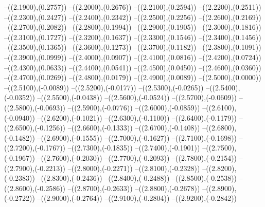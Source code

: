{	--({\sx*(2.1900)},{\sy*(0.2757)})
	--({\sx*(2.2000)},{\sy*(0.2676)})
	--({\sx*(2.2100)},{\sy*(0.2594)})
	--({\sx*(2.2200)},{\sy*(0.2511)})
	--({\sx*(2.2300)},{\sy*(0.2427)})
	--({\sx*(2.2400)},{\sy*(0.2342)})
	--({\sx*(2.2500)},{\sy*(0.2256)})
	--({\sx*(2.2600)},{\sy*(0.2169)})
	--({\sx*(2.2700)},{\sy*(0.2082)})
	--({\sx*(2.2800)},{\sy*(0.1994)})
	--({\sx*(2.2900)},{\sy*(0.1905)})
	--({\sx*(2.3000)},{\sy*(0.1816)})
	--({\sx*(2.3100)},{\sy*(0.1727)})
	--({\sx*(2.3200)},{\sy*(0.1637)})
	--({\sx*(2.3300)},{\sy*(0.1546)})
	--({\sx*(2.3400)},{\sy*(0.1456)})
	--({\sx*(2.3500)},{\sy*(0.1365)})
	--({\sx*(2.3600)},{\sy*(0.1273)})
	--({\sx*(2.3700)},{\sy*(0.1182)})
	--({\sx*(2.3800)},{\sy*(0.1091)})
	--({\sx*(2.3900)},{\sy*(0.0999)})
	--({\sx*(2.4000)},{\sy*(0.0907)})
	--({\sx*(2.4100)},{\sy*(0.0816)})
	--({\sx*(2.4200)},{\sy*(0.0724)})
	--({\sx*(2.4300)},{\sy*(0.0633)})
	--({\sx*(2.4400)},{\sy*(0.0541)})
	--({\sx*(2.4500)},{\sy*(0.0450)})
	--({\sx*(2.4600)},{\sy*(0.0360)})
	--({\sx*(2.4700)},{\sy*(0.0269)})
	--({\sx*(2.4800)},{\sy*(0.0179)})
	--({\sx*(2.4900)},{\sy*(0.0089)})
	--({\sx*(2.5000)},{\sy*(0.0000)})
	--({\sx*(2.5100)},{\sy*(-0.0089)})
	--({\sx*(2.5200)},{\sy*(-0.0177)})
	--({\sx*(2.5300)},{\sy*(-0.0265)})
	--({\sx*(2.5400)},{\sy*(-0.0352)})
	--({\sx*(2.5500)},{\sy*(-0.0438)})
	--({\sx*(2.5600)},{\sy*(-0.0524)})
	--({\sx*(2.5700)},{\sy*(-0.0609)})
	--({\sx*(2.5800)},{\sy*(-0.0693)})
	--({\sx*(2.5900)},{\sy*(-0.0776)})
	--({\sx*(2.6000)},{\sy*(-0.0859)})
	--({\sx*(2.6100)},{\sy*(-0.0940)})
	--({\sx*(2.6200)},{\sy*(-0.1021)})
	--({\sx*(2.6300)},{\sy*(-0.1100)})
	--({\sx*(2.6400)},{\sy*(-0.1179)})
	--({\sx*(2.6500)},{\sy*(-0.1256)})
	--({\sx*(2.6600)},{\sy*(-0.1333)})
	--({\sx*(2.6700)},{\sy*(-0.1408)})
	--({\sx*(2.6800)},{\sy*(-0.1482)})
	--({\sx*(2.6900)},{\sy*(-0.1555)})
	--({\sx*(2.7000)},{\sy*(-0.1627)})
	--({\sx*(2.7100)},{\sy*(-0.1698)})
	--({\sx*(2.7200)},{\sy*(-0.1767)})
	--({\sx*(2.7300)},{\sy*(-0.1835)})
	--({\sx*(2.7400)},{\sy*(-0.1901)})
	--({\sx*(2.7500)},{\sy*(-0.1967)})
	--({\sx*(2.7600)},{\sy*(-0.2030)})
	--({\sx*(2.7700)},{\sy*(-0.2093)})
	--({\sx*(2.7800)},{\sy*(-0.2154)})
	--({\sx*(2.7900)},{\sy*(-0.2213)})
	--({\sx*(2.8000)},{\sy*(-0.2271)})
	--({\sx*(2.8100)},{\sy*(-0.2328)})
	--({\sx*(2.8200)},{\sy*(-0.2383)})
	--({\sx*(2.8300)},{\sy*(-0.2436)})
	--({\sx*(2.8400)},{\sy*(-0.2488)})
	--({\sx*(2.8500)},{\sy*(-0.2538)})
	--({\sx*(2.8600)},{\sy*(-0.2586)})
	--({\sx*(2.8700)},{\sy*(-0.2633)})
	--({\sx*(2.8800)},{\sy*(-0.2678)})
	--({\sx*(2.8900)},{\sy*(-0.2722)})
	--({\sx*(2.9000)},{\sy*(-0.2764)})
	--({\sx*(2.9100)},{\sy*(-0.2804)})
	--({\sx*(2.9200)},{\sy*(-0.2842)})
}
